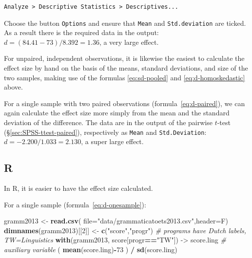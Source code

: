 \documentclass[
]{book}
\newenvironment{Shaded}{\begin{snugshade}}{\end{snugshade}}
\newcommand{\CommentTok}[1]{\textcolor[rgb]{0.56,0.35,0.01}{\textit{#1}}}
\newcommand{\DataTypeTok}[1]{\textcolor[rgb]{0.13,0.29,0.53}{#1}}
\newcommand{\DecValTok}[1]{\textcolor[rgb]{0.00,0.00,0.81}{#1}}
\newcommand{\KeywordTok}[1]{\textcolor[rgb]{0.13,0.29,0.53}{\textbf{#1}}}
\newcommand{\NormalTok}[1]{#1}
\newcommand{\OperatorTok}[1]{\textcolor[rgb]{0.81,0.36,0.00}{\textbf{#1}}}
\newcommand{\StringTok}[1]{\textcolor[rgb]{0.31,0.60,0.02}{#1}}
\begin{document}
\begin{verbatim}
Analyze > Descriptive Statistics > Descriptives...
\end{verbatim}

Choose the button \texttt{Options} and ensure that \texttt{Mean} and \texttt{Std.deviation} are
ticked. As a result there is the required data in the output:\\
\(d = (84.41 - 73) / 8.392 = 1.36\), a very large effect.

For unpaired, independent observations, it is likewise the easiest
to calculate the effect size by hand on the basis of the
means, standard deviations, and size of the two samples, making use
of the formulas
\eqref{eq:sd-pooled} and
\eqref{eq:d-homoskedastic} above.

For a single sample with two paired observations
(formula~\eqref{eq:d-paired}), we can again calculate the effect
size more simply from the mean and the standard deviation of the difference.
The data are in the output of the pairwise \(t\)-test\\
(§\ref{sec:SPSS-ttest-paired}), respectively as \texttt{Mean} and
\texttt{Std.Deviation}:\\
\(d = -2.200 / 1.033 = 2.130\), a super large effect.

\hypertarget{r-13}{%
\subsection{R}\label{r-13}}

In R, it is easier to have the effect size calculated.

For a single sample
(formula~\eqref{eq:d-onesample}):\\

\begin{Shaded}
\begin{Highlighting}[]
\NormalTok{gramm2013 \textless{}{-}}\StringTok{ }\KeywordTok{read.csv}\NormalTok{( }\DataTypeTok{file=}\StringTok{"data/grammaticatoets2013.csv"}\NormalTok{,}\DataTypeTok{header=}\NormalTok{F)}
\KeywordTok{dimnames}\NormalTok{(gramm2013)[[}\DecValTok{2}\NormalTok{]] \textless{}{-}}\StringTok{ }\KeywordTok{c}\NormalTok{(}\StringTok{"score"}\NormalTok{,}\StringTok{"progr"}\NormalTok{)}
\CommentTok{\# programs have Dutch labels, TW=Linguistics}
\KeywordTok{with}\NormalTok{(gramm2013, score[progr}\OperatorTok{==}\StringTok{"TW"}\NormalTok{]) {-}\textgreater{}}\StringTok{ }\NormalTok{score.ling}
\CommentTok{\# auxiliary variable}
\NormalTok{( }\KeywordTok{mean}\NormalTok{(score.ling)}\OperatorTok{{-}}\DecValTok{73}\NormalTok{ ) }\OperatorTok{/}\StringTok{ }\KeywordTok{sd}\NormalTok{(score.ling) }
\end{Highlighting}
\end{Shaded}
\end{document}
